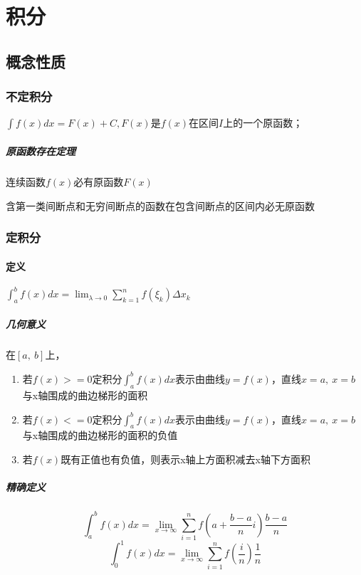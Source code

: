 
\chapter{积分}

\section{概念性质}

\subsection{不定积分}
\(\int f(x)dx = F(x) + C, F(x)\)是\(f(x)\)在区间\(I\)上的一个原函数；

\paragraph{原函数存在定理}
连续函数\(f(x)\)必有原函数\(F(x)\)

含第一类间断点和无穷间断点的函数在包含间断点的区间内必无原函数


\subsection{定积分}

\subsubsection{定义}
\(\displaystyle \int_a^b f(x)dx = \lim_{\lambda\to 0}\sum_{k = 1}^nf(\xi_k)\Delta x_k\)

\paragraph{几何意义}
在\([a,\ b]\)上，
\begin{enumerate}
    \item 若\(f(x) >= 0\)定积分\(\displaystyle\int_a^bf(x)dx\)表示由曲线\(y = f(x)\)，直线\(x = a,\ x = b\)与x轴围成的曲边梯形的面积
    \item 若\(f(x) <= 0\)定积分\(\displaystyle\int_a^bf(x)dx\)表示由曲线\(y = f(x)\)，直线\(x = a,\ x = b\)与x轴围成的曲边梯形的面积的负值
    \item 若\(f(x)\)既有正值也有负值，则表示x轴上方面积减去x轴下方面积
\end{enumerate}

\paragraph{精确定义}
\[\int_a^bf(x)dx = \lim_{x \to \infty}\sum_{i = 1}^nf(a + \dfrac{b - a}{n}i)\dfrac{b - a}{n}\]
\[\int_0^1f(x)dx = \lim_{x \to \infty}\sum_{i = 1}^nf(\dfrac{i}{n})\dfrac{1}{n}\]


